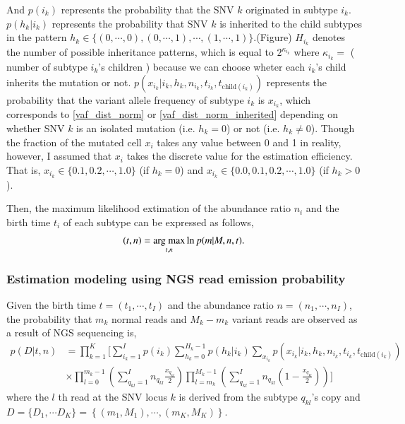 \documentclass{article}
\begin{document}
And $p(i_k)$ represents the probability that the SNV $k$ originated in subtype $i_k$.
$p(h_k | i_k)$ represents the probability that SNV $k$ is inherited to the child subtypes in the pattern $h_k \in \{(0,\cdots,0), (0,\cdots,1), \cdots, (1,\cdots,1)\}$.(Figure)
$H_{i_k}$ denotes the number of possible inheritance patterns, which is equal to $2^{\kappa_{i_k}}$ where $\kappa_{i_k} = $ ( number of subtype $i_k$'s children ) because we can choose wheter each $i_k$'s child inherits the mutation or not.
$p(x_{i_k} | i_k, h_k, n_{i_k}, t_{i_k}, t_{\mathrm{child}(i_k)})$ represents the probability that the variant allele frequency of subtype $i_k$ is $x_{i_k}$,
which corresponds to \eqref{vaf_dist_norm} or \eqref{vaf_dist_norm_inherited} depending on whether SNV $k$ is an isolated mutation (i.e. $h_k = 0$) or not (i.e. $h_k \neq 0$).
Though the fraction of the mutated cell $x_i$ takes any value between 0 and 1 in reality, however, I assumed that $x_i$ takes the discrete value for the estimation efficiency. That is, $x_{i_k} \in \{0.1, 0.2, \cdots, 1.0\}$ (if $h_k = 0$) and $x_{i_k} \in \{0.0, 0.1, 0.2, \cdots, 1.0\}$ (if $h_k > 0$).

Then, the maximum likelihood extimation of the abundance ratio $n_i$ and the birth time $t_i$ of each subtype can be expressed as follows,
\begin{align}
 (t, n) = \mathop{\rm arg~max}\limits_{t, n} \ln p(m | M, n, t).\nonumber
\end{align}

\subsubsection{Estimation modeling using NGS read emission probability}
Given the birth time $t = (t_1, \cdots, t_I)$ and the abundance ratio $n = (n_1, \cdots, n_I)$, the probability that $m_k$ normal reads and $M_k - m_k$ variant reads are observed as a result of NGS sequencing is,
\begin{align}
 p(D | t, n) & = \prod_{k=1}^{K} \Biggl[ \sum_{i_k=1}^{I} p(i_k) \sum_{h_k=0}^{H_k - 1} p(h_k | i_k) \sum_{x_{i_k}} p(x_{i_k} | i_k, h_k, n_{i_k}, t_{i_k}, t_{\mathrm{child}(i_k)}) \nonumber\label{read_emission_modeling}\\
 & \times \prod_{l=0}^{m_k - 1} \left( \sum_{q_{kl}=1}^{I} n_{q_{kl}} \frac{x_{q_{kl}}}{2} \right) \prod_{l=m_k}^{M_k - 1} \left( \sum_{q_{kl}=1}^{I} n_{q_{kl}} \left(1-\frac{x_{q_{kl}}}{2} \right) \right) \Biggr]
\end{align}
where the $l$ th read at the SNV locus $k$ is derived from the subtype $q_{kl}$'s copy and $D = \{D_1, \cdots D_K\} = \left\{(m_1, M_1), \cdots, (m_K, M_K) \right\}$.
\end{document}
